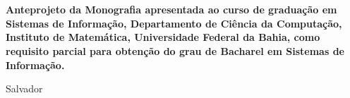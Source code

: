 

\begin{titlepage}
 \vfill
 \begin{center}
   {\large \uppercase{ \bf{ \meunome\ } } } \\[7cm]
   {\Huge \uppercase{ \bf{ \meutitulo\ } } }\\[1cm]
   \vfill
   \hspace{.45\textwidth} %
   \begin{minipage}{.5\textwidth}
     \begin{espacosimples}
       \bf{
	Anteprojeto da Monografia apresentada ao curso de graduação em Sistemas de Informação,
	Departamento de Ciência da Computação, Instituto de Matemática, Universidade Federal da
	Bahia, como requisito parcial para obtenção do grau de Bacharel em Sistemas de Informação. \\
       }
     \end{espacosimples}
     \begin{espacosimples}
       \meuorientador
       \newline
       \meucoorientador
     \end{espacosimples}
   \end{minipage}
   \vfill
   Salvador \\
   \meuano
 \end{center}
\end{titlepage}
